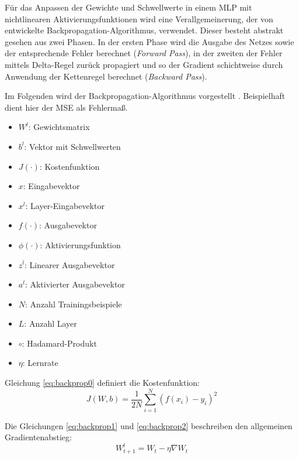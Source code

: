 Für das Anpassen der Gewichte und Schwellwerte in einem MLP mit nichtlinearen Aktivierungsfunktionen wird eine Verallgemeinerung, der von \cite{Rumelhart1986a} entwickelte Backpropagation-Algorithmus, verwendet. Dieser besteht abstrakt gesehen aus zwei Phasen. In der ersten Phase wird die Ausgabe des Netzes sowie der entsprechende Fehler berechnet (\textit{Forward Pass}), in der zweiten der Fehler mittels Delta-Regel zurück propagiert und so der Gradient schichtweise durch Anwendung der Kettenregel berechnet (\textit{Backward Pass}).

Im Folgenden wird der Backpropagation-Algorithmus vorgestellt \cite[vgl. z.B.][S. 151 ff.]{Rojas1996}. Beispielhaft dient hier der MSE als Fehlermaß.


\begin{multicols}{2}
\begin{itemize}
\item $W^l$: Gewichtsmatrix
\item $b^l$: Vektor mit Schwellwerten
\item $J(\cdot)$: Kostenfunktion
\item $x$: Eingabevektor
\item $x^l$: Layer-Eingabevektor 
\item $f(\cdot)$: Ausgabevektor
\item $\phi(\cdot)$: Aktivierungsfunktion
\item $z^l$: Linearer Ausgabevektor
\item $a^l$: Aktivierter Ausgabevektor
\item $N$: Anzahl Trainingsbeispiele
\item $L$: Anzahl Layer
\item $\circ$: Hadamard-Produkt
\item $\eta$: Lernrate
\end{itemize}
\end{multicols}

Gleichung \ref{eq:backprop0} definiert die Kostenfunktion:
\begin{equation} 
\label{eq:backprop0}
J(W,b) = \frac{1}{2N} \sum_{i=1}^{N}(f(x_i) - y_i)^2	
\end{equation}

Die Gleichungen \ref{eq:backprop1} und \ref{eq:backprop2} beschreiben den allgemeinen Gradientenabstieg:
\begin{equation} 
\label{eq:backprop1}
W_{t+1}^l = W_t - \eta {\nabla W_t} %
\end{equation}

